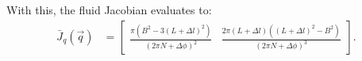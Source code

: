 With this, the fluid Jacobian evaluates to:
\begin{align}
    \bar{J}_q (\vec{q})
    &= \begin{bmatrix} 
		        \frac{\pi \left( B^2 - 3(L + \Delta l)^2 \right)}{(2 \pi N + \Delta \phi)^2} & \frac{2 \pi (L+\Delta l) \left( (L+\Delta l)^2 - B^2 \right)}{(2 \pi N + \Delta \phi)^3}
		\end{bmatrix}.    \label{eq:Jv}
\end{align}






